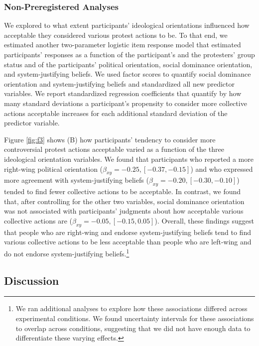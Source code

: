 \documentclass[12pt, letterpaper]{article}
\begin{document}
\hypertarget{non-preregistered-analyses}{%
\subsubsection{Non-Preregistered
Analyses}\label{non-preregistered-analyses}}

We explored to what extent participants' ideological orientations
influenced how acceptable they considered various protest actions to be.
To that end, we estimated another two-parameter logistic item response
model that estimated participants' responses as a function of the
participant's and the protesters' group status and of the participants'
political orientation, social dominance orientation, and
system-justifying beliefs. We used factor scores to quantify social
dominance orientation and system-justifying beliefs and standardized all
new predictor variables. We report standardized regression coefficients
that quantify by how many standard deviations a participant's propensity
to consider more collective actions acceptable increases for each
additional standard deviation of the predictor variable.

Figure \ref{fig:f3} shows (B) how participants' tendency to consider
more controversial protest actions acceptable varied as a function of
the three ideological orientation variables. We found that participants
who reported a more right-wing political orientation
(\(\beta_{xy} = -0.25, [-0.37, -0.15]\)) and who expressed more
agreement with system-justifying beliefs
(\(\beta_{xy} = -0.20, [-0.30, -0.10]\)) tended to find fewer collective
actions to be acceptable. In contrast, we found that, after controlling
for the other two variables, social dominance orientation was not
associated with participants' judgments about how acceptable various
collective actions are (\(\beta_{xy} = -0.05, [-0.15, 0.05]\)). Overall,
these findings suggest that people who are right-wing and endorse
system-justifying beliefs tend to find various collective actions to be
less acceptable than people who are left-wing and do not endorse
system-justifying beliefs.\footnote{We ran additional analyses to
  explore how these associations differed across experimental
  conditions. We found uncertainty intervals for these associations to
  overlap across conditions, suggesting that we did not have enough data
  to differentiate these varying effects.}

\hypertarget{discussion}{%
\subsection{Discussion}\label{discussion}}
\end{document}
